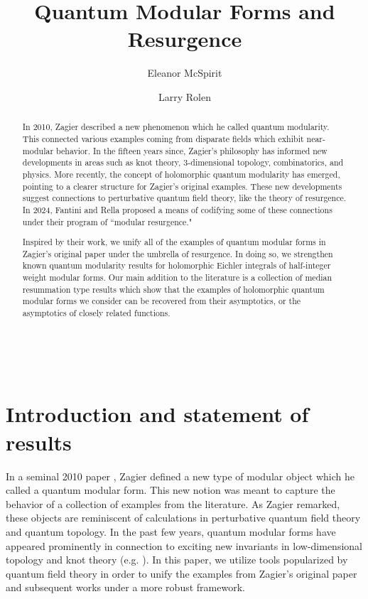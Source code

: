 \documentclass[12pt]{amsart}
\theoremstyle{definition}
\theoremstyle{plain}
\numberwithin{equation}{section}
\begin{document}
\onehalfspacing

\title{Quantum Modular Forms and Resurgence}
\author{Eleanor McSpirit}
\address{Department of Mathematics, Vanderbilt University, Nashville, TN 37240}
\author{Larry Rolen}



\keywords{}
\subjclass[2020]{}

\begin{abstract} 

In 2010, Zagier described a new phenomenon which he called quantum modularity. This connected various examples coming from disparate fields which exhibit near-modular behavior.
In the fifteen years since, Zagier's philosophy has informed new developments in areas such as knot theory, 3-dimensional topology, combinatorics, and physics. More recently, the concept of holomorphic quantum modularity has emerged, pointing to a clearer structure for Zagier's original examples. These new developments suggest connections to perturbative quantum field theory, like the theory of resurgence. In 2024, Fantini and Rella proposed a means of 
codifying some of these connections under their program of ``modular resurgence." 

Inspired by their work, we unify all of the  examples of quantum modular forms in Zagier's original paper under the umbrella of resurgence. In doing so, we strengthen known quantum modularity results for holomorphic Eichler integrals of half-integer weight modular forms. Our main addition to the literature is a collection of median resummation type results which show that the examples of holomorphic quantum modular forms we consider can be recovered from their asymptotics, or the asymptotics of closely related functions. 
\end{abstract}

\

\maketitle

\section{Introduction and statement of results}

In a seminal 2010 paper \cite{zagier-quantum}, Zagier defined a new type of modular object which he called a quantum modular form. This new notion was meant to capture the behavior of a collection of examples from the literature. As Zagier remarked, these objects are reminiscent of calculations in perturbative quantum field theory and quantum topology. In the past few years, quantum modular forms have
appeared prominently in connection to exciting new invariants in low-dimensional topology and knot theory (e.g. \cite{gppv,g-z-24,ajk}).
In this paper, we utilize tools popularized by quantum field theory in order to unify the examples from Zagier's original paper and subsequent works under a more robust framework. 
\end{document}
